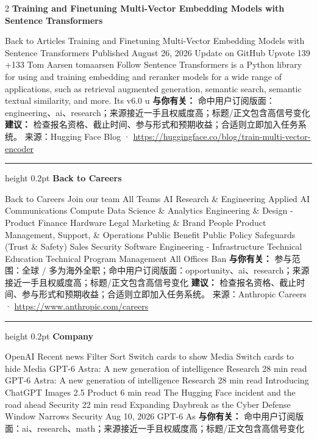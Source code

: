 \documentclass[10.5pt]{ctexart}
\begin{document}
\begin{multicols}{2}
{\large\bfseries Training and Finetuning Multi-Vector Embedding Models with Sentence Transformers}\par
Back to Articles Training and Finetuning Multi-Vector Embedding Models with Sentence Transformers Published August 26, 2026 Update on GitHub Upvote 139 +133 Tom Aarsen tomaarsen Follow Sentence Transformers is a Python library for using and training embedding and reranker models for a wide range of applications, such as retrieval augmented generation, semantic search, semantic textual similarity, and more. Its v6.0 u
\textbf{与你有关：} 命中用户订阅版面：engineering、ai、research；来源接近一手且权威度高；标题/正文包含高信号变化
\textbf{建议：} 检查报名资格、截止时间、参与形式和预期收益；合适则立即加入任务系统。
{\footnotesize\color{ormuted} 来源：Hugging Face Blog · \url{https://huggingface.co/blog/train-multi-vector-encoder}}
\vspace{2mm}
\hrule height 0.2pt
\vspace{2mm}
{\large\bfseries Back to Careers}\par
Back to Careers Join our team All Teams AI Research \& Engineering Applied AI Communications Compute Data Science \& Analytics Engineering \& Design - Product Finance Hardware Legal Marketing \& Brand People Product Management, Support, \& Operations Public Benefit Public Policy Safeguards (Trust \& Safety) Sales Security Software Engineering - Infrastructure Technical Education Technical Program Management All Offices Ban
\textbf{与你有关：} 参与范围：全球 / 多为海外全职；命中用户订阅版面：opportunity、ai、research；来源接近一手且权威度高；标题/正文包含高信号变化
\textbf{建议：} 检查报名资格、截止时间、参与形式和预期收益；合适则立即加入任务系统。
{\footnotesize\color{ormuted} 来源：Anthropic Careers · \url{https://www.anthropic.com/careers}}
\vspace{2mm}
\hrule height 0.2pt
\vspace{2mm}
{\large\bfseries Company}\par
OpenAI Recent news Filter Sort Switch cards to show Media Switch cards to hide Media GPT-6 Astra: A new generation of intelligence Research 28 min read GPT-6 Astra: A new generation of intelligence Research 28 min read Introducing ChatGPT Images 2.5 Product 6 min read The Hugging Face incident and the road ahead Security 22 min read Expanding Daybreak as the Cyber Defense Window Narrows Security Aug 10, 2026 GPT-6 As
\textbf{与你有关：} 命中用户订阅版面：ai、research、math；来源接近一手且权威度高；标题/正文包含高信号变化

\end{multicols}
\end{document}
